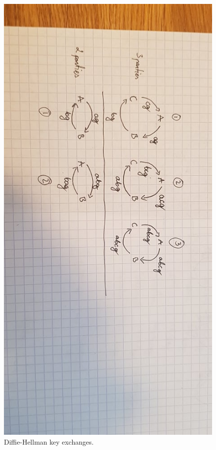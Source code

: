 \documentclass{article}
\begin{document}
\begin{figure}[H]
    \centering
    \label{fig:dh}
    \includegraphics[scale=0.3, angle=90]{dh.jpg}
    \caption{Diffie-Hellman key exchanges.}
\end{figure}


\end{document}
